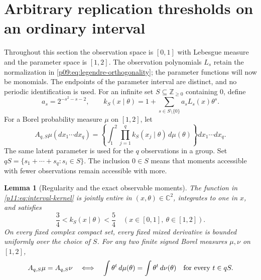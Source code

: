 \documentclass[11pt,letterpaper]{article}
\newtheorem{lemma}[theorem]{Lemma}
\theoremstyle{definition}
\theoremstyle{remark}
\newcommand{\1}{\mathbf 1}
\begin{document}
\section{Arbitrary replication thresholds on an ordinary interval}
\label{p11:sec:interval-core}

Throughout this section the observation space is $[0,1]$ with Lebesgue
measure and the parameter space is $[1,2]$. The observation polynomials
$L_s$ retain the normalization in \eqref{p09:eq:legendre-orthogonality};
the parameter functions will now be monomials. The endpoints of the
parameter interval are distinct, and no periodic identification is used.
For an infinite set $S\subseteq\mathbb Z_{\geq0}$ containing $0$, define
\begin{equation}\label{p11:eq:interval-kernel}
 a_s=2^{-s^2-s-2},\qquad
 k_S(x\mid\theta)=1+\sum_{s\in S\setminus\{0\}}
               a_sL_s(x)\theta^s.
\end{equation}
For a Borel probability measure $\mu$ on $[1,2]$, let
\[
 A_{q,S}\mu(dx_1\cdots dx_q)
 =\left\{\int_{1}^{2}\prod_{j=1}^q k_S(x_j\mid\theta)
                      \,d\mu(\theta)\right\}dx_1\cdots dx_q.
\]
The same latent parameter is used for the $q$ observations in a group.
Set $qS=\{s_1+\cdots+s_q:s_i\in S\}$.  The inclusion $0\in S$ means that
moments accessible with fewer observations remain accessible with more.

\begin{lemma}[Regularity and the exact observable moments]
\label{p11:lem:interval-observability}
The function in \eqref{p11:eq:interval-kernel} is jointly entire in
$(x,\theta)\in\mathbb C^2$, integrates to one in $x$, and satisfies
\[
 \frac34<k_S(x\mid\theta)<\frac54
 \quad (x\in[0,1],\ \theta\in[1,2]).
\]
On every fixed complex compact set, every fixed mixed derivative is
bounded uniformly over the choice of $S$.  For any two finite signed
Borel measures $\mu,\nu$ on $[1,2]$,
\begin{equation}\label{p11:eq:observable-sumset}
 A_{q,S}\mu=A_{q,S}\nu
 \quad\Longleftrightarrow\quad
 \int\theta^t\,d\mu(\theta)=\int\theta^t\,d\nu(\theta)
 \quad\hbox{for every }t\in qS.
\end{equation}
\end{lemma}
\end{document}
